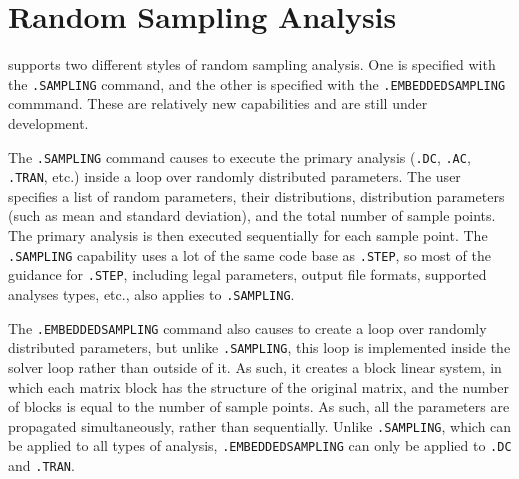 

\clearpage
\section{Random Sampling Analysis}
\label{SAMPLING_Analysis}
\label{sampling_Overview}
  
\Xyce{} supports two different styles of random sampling analysis.  One is specified 
with the \verb|.SAMPLING| 
command, and the other is specified with the \verb|.EMBEDDEDSAMPLING| commmand.  
These are relatively new capabilities and are still under development.  

The \verb|.SAMPLING| command causes \Xyce{} to execute the primary analysis (\verb|.DC|,
\verb|.AC|, \verb|.TRAN|, etc.) inside a loop over randomly distributed parameters.  
The user specifies a list of random parameters, their distributions, distribution 
parameters (such as mean and standard deviation), and the total number of 
sample points.  The primary analysis is then executed sequentially for each sample point.
The \verb|.SAMPLING| capability uses a lot of the same code base as \verb|.STEP|, 
so most of the guidance for \verb|.STEP|, including legal parameters, output 
file formats, supported analyses types, etc., also applies to \verb|.SAMPLING|.

The \verb|.EMBEDDEDSAMPLING| command also causes \Xyce{} to create a loop over 
randomly distributed parameters, but unlike \verb|.SAMPLING|, this loop is 
implemented inside the solver loop rather than outside of it.  As such, it 
creates a block linear system, in which each matrix block has the structure 
of the original matrix, and the number of blocks is equal to the number of sample points.
As such, all the parameters are propagated simultaneously, rather than sequentially.
Unlike \verb|.SAMPLING|, which can be applied to all types of \Xyce{} analysis, 
\verb|.EMBEDDEDSAMPLING| can only be applied to \verb|.DC| and \verb|.TRAN|.


